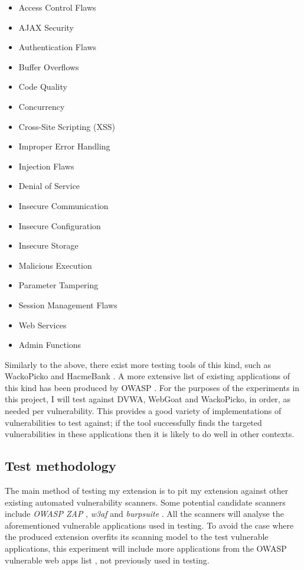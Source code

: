 \begin{multicols}{3}
\begin{itemize}
\item 	Access Control Flaws
\item 	AJAX Security
\item 	Authentication Flaws
\item 	Buffer Overflows
\item 	Code Quality
\item 	Concurrency
\item 	Cross-Site Scripting (XSS)
\item 	Improper Error Handling
\item 	Injection Flaws
\item 	Denial of Service
\item 	Insecure Communication
\item 	Insecure Configuration
\item 	Insecure Storage
\item 	Malicious Execution
\item 	Parameter Tampering
\item 	Session Management Flaws
\item 	Web Services
\item 	Admin Functions
\end{itemize}
\end{multicols}

Similarly to the above, there exist more testing tools of this kind, such as WackoPicko \cite{wackoPickoGithub} and HacmeBank \cite{hacmeBankMcAfee}. A more extensive list of existing applications of this kind has been produced by OWASP \cite{owaspVulnerableWebAppsList}. For the purposes of the experiments in this project, I will test against DVWA, WebGoat and WackoPicko, in order, as needed per vulnerability. This provides a good variety of implementations of vulnerabilities to test against; if the tool successfully finds the targeted vulnerabilities in these applications then it is likely to do well in other contexts.

\subsection{Test methodology}
The main method of testing my extension is to pit my extension against other existing automated vulnerability scanners. Some potential candidate scanners include \emph{OWASP ZAP} \cite{owaspZapPage}, \emph{w3af} \cite{w3af} and \emph{burpsuite} \cite{burpSuitePage}. All the scanners will analyse the aforementioned vulnerable applications used in testing. To avoid the case where the produced extension overfits its scanning model to the test vulnerable applications, this experiment will include more applications from the OWASP vulnerable web apps list \cite{owaspVulnerableWebAppsList}, not previously used in testing. \\

